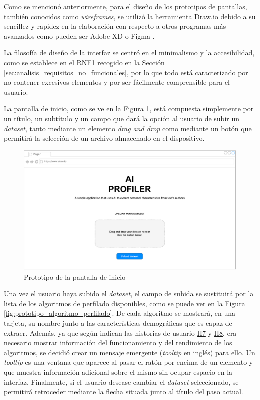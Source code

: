 Como se mencionó anteriormente, para el diseño de los prototipos de pantallas, también conocidos como \textit{wireframes}, se utilizó
la herramienta Draw.io \cite{drawio} debido a su sencillez y rapidez en la elaboración con respecto a otros programas más avanzados
como pueden ser Adobe XD \cite{adobexd} o Figma \cite{figma}.

\bigskip
La filosofía de diseño de la interfaz se centró en el minimalismo y la accesibilidad, como se establece en el \hyperref[req:rnf1]{RNF1}
recogido en la Sección \ref{sec:analisis_requisitos_no_funcionales}, por lo que todo está caracterizado por no contener excesivos elementos y por ser fácilmente comprensible para el usuario.

\bigskip
La pantalla de inicio, como se ve en la Figura \ref{fig:prototipo_inicio}, está compuesta simplemente por un título,
un subtítulo y un campo que dará la opción al usuario de subir un \textit{dataset}, tanto mediante un elemento \textit{drag and drop} como
mediante un botón que permitirá la selección de un archivo almacenado en el dispositivo.

\bigskip
\begin{figure}[H]
	\centering
	\includegraphics[width=\textwidth]{diagramas/landing.pdf}
	\caption{Prototipo de la pantalla de inicio}
	\label{fig:prototipo_inicio}
\end{figure}

\bigskip
Una vez el usuario haya subido el \textit{dataset}, el campo de subida se sustituirá por la lista de los
algoritmos de perfilado disponibles, como se puede ver en la Figura \ref{fig:prototipo_algoritmo_perfilado}. De cada algoritmo se mostrará,
en una tarjeta, su nombre junto a las características demográficas que es capaz de extraer. Además, ya que según indican las historias de usuario \hyperref[req:hu7]{H7} y \hyperref[req:hu8]{H8},
era necesario mostrar información del funcionamiento
y del rendimiento de los algoritmos, se decidió crear un mensaje emergente (\textit{tooltip} en inglés) para ello. Un \textit{tooltip} es una ventana
que aparece al pasar el ratón por encima de un elemento y que muestra información adicional sobre el mismo sin ocupar espacio
en la interfaz. Finalmente, si el usuario desease cambiar el \textit{dataset} seleccionado, se permitirá retroceder mediante
la flecha situada junto al título del paso actual.

